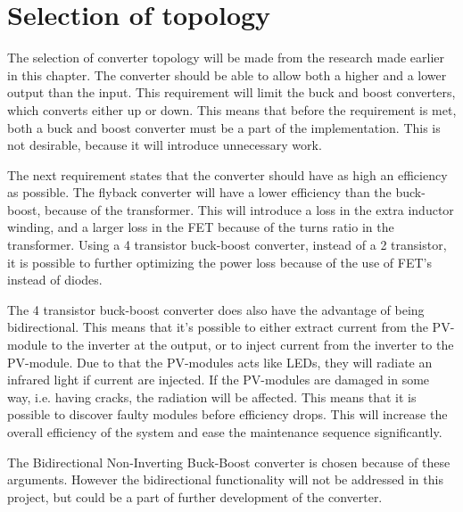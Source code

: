 \section{Selection of topology}\label{selection_of_topology}
The selection of converter topology will be made from the research made earlier in this chapter. The converter should be able to allow both a higher and a lower output than the input. This requirement will limit the buck and boost converters, which converts either up or down. This means that before the requirement is met, both a buck and boost converter must be a part of the implementation. This is not desirable, because it will introduce unnecessary work.  

The next requirement states that the converter should have as high an efficiency as possible. The flyback converter will have a lower efficiency than the buck-boost, because of the transformer. This will introduce a loss in the extra inductor winding, and a larger loss in the FET because of the turns ratio in the transformer. Using a 4 transistor buck-boost converter, instead of a 2 transistor, it is possible to further optimizing the power loss because of the use of FET's instead of diodes. 

The 4 transistor buck-boost converter does also have the advantage of being bidirectional. This means that it's possible to either extract current from the PV-module to the inverter at the output, or to inject current from the inverter to the PV-module. Due to that the PV-modules acts like LEDs, they will radiate an infrared light if current are injected. If the PV-modules are damaged in some way, i.e. having cracks, the radiation will be affected. This means that it is possible to discover faulty modules before efficiency drops. This will increase the overall efficiency of the system and ease the maintenance sequence significantly. 

The Bidirectional Non-Inverting Buck-Boost converter is chosen because of these arguments. However the bidirectional functionality will not be addressed in this project, but could be a part of further development of the converter. 






 